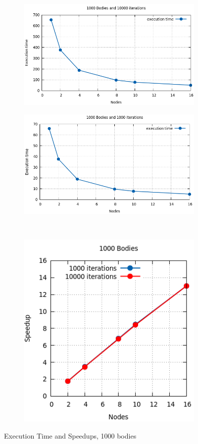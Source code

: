 \documentclass[a4paper]{article}
\begin{document}
\begin{figure}[ht]
\begin{subfigure}{.5\textwidth}
  \centering
  \includegraphics[width=1\linewidth]{results/graph19}
\end{subfigure} %
\begin{subfigure}{.5\textwidth}
  \centering
  \includegraphics[width=1\linewidth]{results/graph17}
\end{subfigure} \\ %
\begin{subfigure}{\textwidth}
  \centering
  \includegraphics[width=.4\linewidth]{results/graph18}
\end{subfigure} 
  \caption{Execution Time and Speedups, 1000 bodies}
  \label{fig:R3}
\end{figure}
\FloatBarrier
\end{document}
